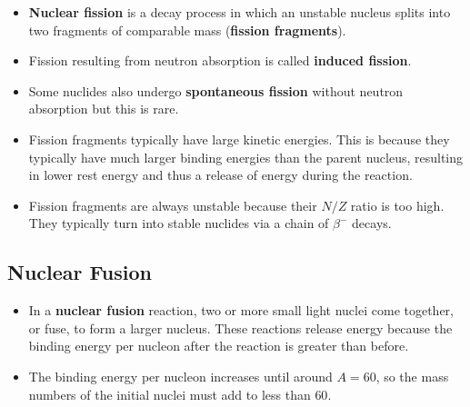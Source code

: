 \documentclass{article}
\begin{document}
\begin{itemize}
  \item \textbf{Nuclear fission} is a decay process in which an unstable nucleus splits into two fragments of comparable mass (\textbf{fission fragments}).

  \item Fission resulting from neutron absorption is called \textbf{induced fission}.

  \item Some nuclides also undergo \textbf{spontaneous fission} without neutron absorption but this is rare.

  \item Fission fragments typically have large kinetic energies. This is because they typically have much larger binding energies than the parent nucleus, resulting in lower rest energy and thus a release of energy during the reaction.

  \item Fission fragments are always unstable because their $N / Z$ ratio is too high. They typically turn into stable nuclides via a chain of $\beta^-$ decays.
\end{itemize}

\subsection{Nuclear Fusion}

\begin{itemize}
  \item In a \textbf{nuclear fusion} reaction, two or more small light nuclei come together, or fuse, to form a larger nucleus. These reactions release energy because the binding energy per nucleon after the reaction is greater than before.

  \item The binding energy per nucleon increases until around $A = 60$, so the mass numbers of the initial nuclei must add to less than $60$.
\end{itemize}
\end{document}
